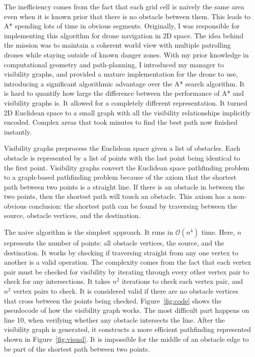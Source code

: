 \documentclass[12pt]{article}
\begin{document}
The inefficiency comes from the fact that each grid cell is naively the same area even when it is known prior that there is no obstacle between them. This leads to A* spending lots of time in obvious segments. Originally, I was responsible for implementing this algorithm for drone navigation in 2D space. The idea behind the mission was to maintain a coherent world view with multiple patrolling drones while staying outside of known danger zones. With my prior knowledge in computational geometry and path-planning, I introduced my manager to visibility graphs, and provided a mature implementation for the drone to use, introducing a significant algorithmic advantage over the A* search algorithm. It is hard to quantify how large the difference between the performance of A* and visibility graphs is. It allowed for a completely different representation. It turned 2D Euclidean space to a small graph with all the visibility relationships implicitly encoded. Complex areas that took minutes to find the best path now finished instantly.

Visibility graphs preprocess the Euclidean space given a list of obstacles. \cite{lozano-perezAlgorithmPlanningCollisionfree1979} Each obstacle is represented by a list of points with the last point being identical to the first point. Visibility graphs convert the Euclidean space pathfinding problem to a graph-based pathfinding problem because of the axiom that the shortest path between two points is a straight line. If there is an obstacle in between the two points, then the shortest path will touch an obstacle. This axiom has a non-obvious conclusion: the shortest path can be found by traversing between the source, obstacle vertices, and the destination.

The naive algorithm is the simplest approach. It runs in $\mathcal{O}(n^4)$ time. Here, $n$ represents the number of points: all obstacle vertices, the source, and the destination. It works by checking if traversing straight from any one vertex to another is a valid operation. The complexity comes from the fact that each vertex pair must be checked for visibility by iterating through every other vertex pair to check for any intersections. It takes $n^2$ iterations to check each vertex pair, and $n^2$ vertex pairs to check. It is considered valid if there are no obstacle vertices that cross between the points being checked. Figure~\ref{fig:code} shows the pseudocode of how the visibility graph works. The most difficult part happens on line 10, when verifying whether any obstacle intersects the line. After the visibility graph is generated, it constructs a more efficient pathfinding represented shown in Figure~\ref{fig:visual}. It is impossible for the middle of an obstacle edge to be part of the shortest path between two points.
\end{document}

